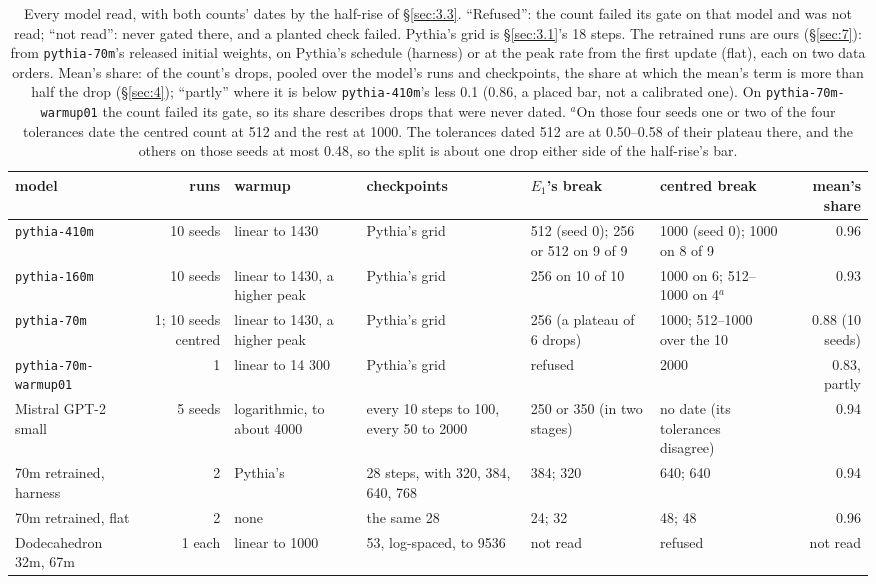 \documentclass[11pt]{article}
\begin{document}
\begin{table}[tbp]
\centering\small
\caption{Every model read, with both counts' dates by the half-rise of \S\ref{sec:3.3}. ``Refused'': the count failed its gate on that model and was not read; ``not read'': never gated there, and a planted check failed. Pythia's grid is \S\ref{sec:3.1}'s 18 steps. The retrained runs are ours (\S\ref{sec:7}): from \texttt{pythia-70m}'s released initial weights, on Pythia's schedule (harness) or at the peak rate from the first update (flat), each on two data orders. Mean's share: of the count's drops, pooled over the model's runs and checkpoints, the share at which the mean's term is more than half the drop (\S\ref{sec:4}); ``partly'' where it is below \texttt{pythia-410m}'s less 0.1 (0.86, a placed bar, not a calibrated one). On \texttt{pythia-70m-warmup01} the count failed its gate, so its share describes drops that were never dated. $^{a}$On those four seeds one or two of the four tolerances date the centred count at 512 and the rest at 1000. The tolerances dated 512 are at 0.50--0.58 of their plateau there, and the others on those seeds at most 0.48, so the split is about one drop either side of the half-rise's bar.}\label{tab:models}
\begin{tabularx}{\linewidth}{@{}M R Y Y Y Y R@{}}
\toprule
model & runs & warmup & checkpoints & $E_{1}$'s break & centred break & mean's share \\
\midrule
\texttt{pythia-410m} & 10 seeds & linear to 1430 & Pythia's grid & 512 (seed 0); 256 or 512 on 9 of 9 & 1000 (seed 0); 1000 on 8 of 9 & 0.96 \\
\texttt{pythia-160m} & 10 seeds & linear to 1430, a higher peak & Pythia's grid & 256 on 10 of 10 & 1000 on 6; 512--1000 on 4$^{a}$ & 0.93 \\
\texttt{pythia-70m} & 1; 10 seeds centred & linear to 1430, a higher peak & Pythia's grid & 256 (a plateau of 6 drops) & 1000; 512--1000 over the 10 & 0.88 (10 seeds) \\
\texttt{pythia-70m-} \texttt{warmup01} & 1 & linear to 14 300 & Pythia's grid & refused & 2000 & 0.83, partly \\
Mistral GPT-2 small & 5 seeds & logarithmic, to about 4000 & every 10 steps to 100, every 50 to 2000 & 250 or 350 (in two stages) & no date (its tolerances disagree) & 0.94 \\
70m retrained, harness & 2 & Pythia's & 28 steps, with 320, 384, 640, 768 & 384; 320 & 640; 640 & 0.94 \\
70m retrained, flat & 2 & none & the same 28 & 24; 32 & 48; 48 & 0.96 \\
Dodecahedron 32m, 67m & 1 each & linear to 1000 & 53, log-spaced, to 9536 & not read & refused & not read \\
\bottomrule
\end{tabularx}
\end{table}
\end{document}
